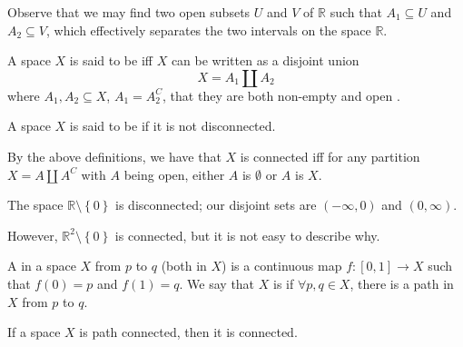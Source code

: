 \documentclass[notoc,notitlepage]{tufte-book}
\begin{document}
Observe that we may find two open subsets $U$ and $V$ of $\mathbb{R}$ such that $A_1 \subseteq U$
and $A_2 \subseteq V$, which effectively separates the two intervals on the space $\mathbb{R}$.

\begin{defn}[Disconnectedness]\label{defn:disconnectedness}
  A space $X$ is said to be  iff $X$ can be written as a
  disjoint union
  \begin{equation*}
    X = A_1 \coprod A_2
  \end{equation*}
  where $A_1, A_2 \subseteq X$, $A_1 = A_2^C$, that they are both non-empty and open
  .
\end{defn}

\begin{defn}[Connectedness]\label{defn:connectedness}
  A space $X$ is said to be  if it is not disconnected.
\end{defn}

\begin{note}
  By the above definitions, we have that $X$ is connected iff for any partition
  $X = A \coprod A^C$ with $A$ being open, either $A$ is $\emptyset$ or $A$ is $X$.
\end{note}

\begin{eg}
  The space $\mathbb{R} \setminus \left\{ 0 \right\}$ is disconnected; our disjoint sets
  are $(-\infty, 0)$ and $(0, \infty)$.
\end{eg}

However, $\mathbb{R}^2 \setminus \left\{ 0 \right\}$ is connected, but it is not easy to
describe why.

\begin{defn}[Path]\label{defn:path}
  A  in a space $X$ from $p$ to $q$ (both in $X$) is a continuous map
  $f : [0, 1] \to X$ such that $f(0) = p$ and $f(1) = q$. We say that $X$ is
   if $\forall p, q \in X$, there is a path in $X$ from $p$
  to $q$.
\end{defn}

\begin{lemma}\label{lemma:path_connectedness_implies_connectedness}
  If a space $X$ is path connected, then it is connected.
\end{lemma}
\end{document}
